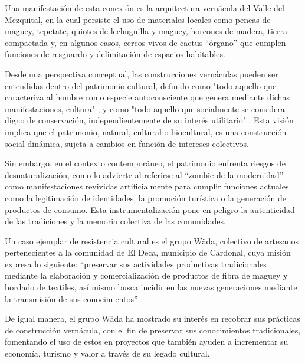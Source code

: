 Una manifestación de esta conexión es la arquitectura vernácula del Valle del Mezquital, en la cual persiste el uso de materiales locales como pencas de maguey, tepetate, quiotes de lechuguilla y maguey, horcones de madera, tierra compactada y, en algunos casos, cercos vivos de cactus ``órgano'' que cumplen funciones de resguardo y delimitación de espacios habitables.

Desde una perspectiva conceptual, las construcciones vernáculas pueden ser entendidas dentro del patrimonio cultural, definido como "todo aquello que caracteriza al hombre como especie autoconsciente que genera mediante dichas manifestaciones, cultura" \citep{dominguez2004pautas}, y como "todo aquello que socialmente se considera digno de conservación, independientemente de su interés utilitario" \citep[p. 63]{prats1998concepto}. Esta visión implica que el patrimonio, natural, cultural o biocultural, es una construcción social dinámica, sujeta a cambios en función de intereses colectivos.

Sin embargo, en el contexto contemporáneo, el patrimonio enfrenta riesgos de desnaturalización, como lo advierte \cite{i2008zombi} al referirse al ``zombie de la modernidad'' como manifestaciones revividas artificialmente para cumplir funciones actuales como la legitimación de identidades, la promoción turística o la generación de productos de consumo. Esta instrumentalización pone en peligro la autenticidad de las tradiciones y la memoria colectiva de las comunidades.

Un caso ejemplar de resistencia cultural es el grupo Wäda, colectivo de artesanos pertenecientes a la comunidad de El Deca, municipio de Cardonal, cuya misión expresa lo siguiente: ``preservar sus actividades productivas tradicionales mediante la elaboración y comercialización de productos de fibra de maguey y bordado de textiles, así mismo busca incidir en las nuevas generaciones mediante la transmisión de sus conocimientos''

De igual manera, el grupo Wäda ha mostrado su interés en recobrar sus prácticas de construcción vernácula, con el fin de preservar sus conocimientos tradicionales, fomentando el uso de estos en proyectos que también ayuden a incrementar su economía, turismo y valor a través de su legado cultural.
